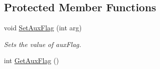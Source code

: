 \subsection*{Protected Member Functions}
\begin{DoxyCompactItemize}
\item 
\hypertarget{classDMatrix_a45db94207b6ce1580b2b280d620de7dd}{
void \hyperlink{classDMatrix_a45db94207b6ce1580b2b280d620de7dd}{SetAuxFlag} (int arg)}
\label{classDMatrix_a45db94207b6ce1580b2b280d620de7dd}

\begin{DoxyCompactList}\small\item\em Sets the value of auxFlag. \item\end{DoxyCompactList}\item 
\hypertarget{classDMatrix_ac4fb297fbf91ef6f520158636ad85f4e}{
int \hyperlink{classDMatrix_ac4fb297fbf91ef6f520158636ad85f4e}{GetAuxFlag} ()}
\label{classDMatrix_ac4fb297fbf91ef6f520158636ad85f4e}


\end{DoxyCompactItemize}
